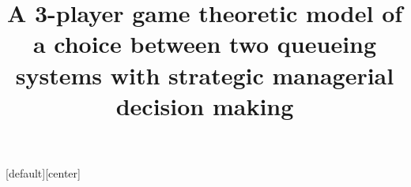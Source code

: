 \documentclass{beamer}
\title{A 3-player game theoretic model of a choice between two queueing systems with strategic managerial decision making}
\author{}
\date{}
\begin{document}
    \frame{
        \titlepage
        \centering
    }
    [default][center]
    
    
    
    
    
    
    
\end{document}
